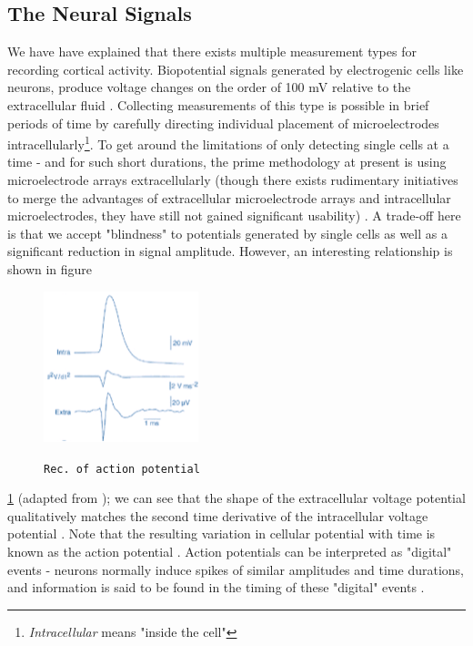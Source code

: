   
    \subsection{The Neural Signals}
     \label{subsec:neural-signals}
    We have have explained that there exists multiple measurement types for recording cortical activity. Biopotential signals generated by electrogenic cells like neurons, produce voltage changes on the order of 100 mV relative to the extracellular fluid \cite{kandel2000principles}. Collecting measurements of this type is possible in brief periods of time by carefully directing individual placement of microelectrodes intracellularly\footnote{\emph{Intracellular} means "inside the cell"}. To get around the limitations of only detecting single cells at a time - and for such short durations, the prime methodology at present is using microelectrode arrays extracellularly (though there exists rudimentary initiatives to merge the advantages of extracellular microelectrode arrays and intracellular microelectrodes, they have still not gained significant usability) \cite{spira2013multi}. A trade-off here is that we accept "blindness" to potentials generated by single cells as well as a significant reduction in signal amplitude. However, an interesting relationship is shown in figure %
    \begin{figure}
      \vspace{-20pt}
      \caption{\texttt{\footnotesize{Rec. of action potential}}}
      \includegraphics[width=4.5cm]{images/intracellular-amp-vs-extracellular-amp.png}
      \vspace{-25pt} 
      \label{fig:intracell-vs-extracell}
    \end{figure}
\ref{fig:intracell-vs-extracell} (adapted from \cite{extracell-action-pot-2009}); we can see that the shape of the extracellular voltage potential qualitatively matches the second time derivative of the intracellular voltage potential \cite{cohen2000contributions}. Note that the resulting variation in cellular potential with time is known as the action potential \cite{GBM8320-2013-electrodes-ch8-pt1}. Action potentials can be interpreted as "digital" events  - neurons normally induce spikes of similar amplitudes and time durations, and information is said to be found in the timing of these "digital" events \cite{harrison2008design}.
    

